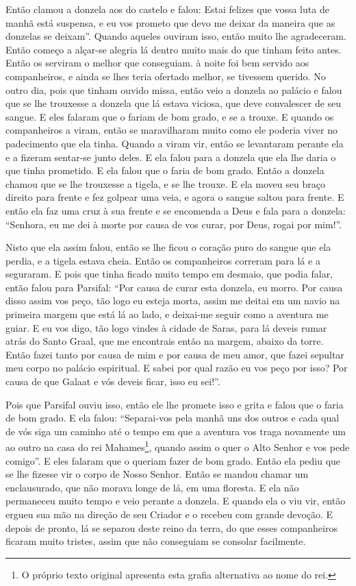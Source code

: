 Então clamou a donzela aos do castelo e falou: Estai felizes que vossa luta de
manhã está suspensa, e eu vos prometo que devo me deixar da maneira que as
donzelas se deixam”. Quando aqueles ouviram isso, então muito lhe agradeceram.
Então começo a alçar-se alegria lá dentro muito mais do que tinham feito antes.
Então os serviram o melhor que conseguiam. à noite foi bem servido aos
companheiros, e ainda se lhes teria ofertado melhor, se tivessem querido. No
outro dia, pois que tinham ouvido missa, então veio a donzela ao palácio e
falou que se lhe trouxesse a donzela que lá estava viciosa, que deve
convalescer de seu sangue. E eles falaram que o fariam de bom grado, e se a
trouxe. E quando os companheiros a viram, então se maravilharam muito como ele
poderia viver no padecimento que ela tinha. Quando a viram vir, então se
levantaram perante ela e a fizeram sentar-se junto deles. E ela falou para a
donzela que ela lhe daria o que tinha prometido. E ela falou que o faria de bom
grado. Então a donzela chamou que se lhe trouxesse a tigela, e se lhe trouxe. E
ela moveu seu braço direito para frente e fez golpear uma veia, e agora o
sangue saltou para frente. E então ela faz uma cruz à sua frente e se encomenda
a Deus e fala para a donzela: “Senhora, eu me dei à morte por causa de vos
curar, por Deus, rogai por mim!”.

Nisto que ela assim falou, então se lhe ficou o coração puro do sangue que ela
perdia, e a tigela estava cheia. Então os companheiros correram para lá e a
seguraram. E pois que tinha ficado muito tempo em desmaio, que podia falar,
então falou para Parsifal: “Por causa de curar esta donzela, eu morro. Por
causa disso assim vos peço, tão logo eu esteja morta, assim me deitai em um
navio na primeira margem que está lá ao lado, e deixai-me seguir como a
aventura me guiar. E eu vos digo, tão logo vindes à cidade de Saras, para lá
deveis rumar atrás do Santo Graal, que me encontrais então na margem, abaixo da
torre. Então fazei tanto por causa de mim e por causa de meu amor, que fazei
sepultar meu corpo no palácio espiritual. E sabei por qual razão eu vos peço
por isso? Por causa de que Galaat e vós deveis ficar, isso eu sei!”.

Pois que Parsifal ouviu isso, então ele lhe promete isso e grita e falou que o
faria de bom grado. E ela falou: “Separai-vos pela manhã uns dos outros e cada
qual de vós siga um caminho até o tempo em que a aventura vos traga novamente
um ao outro na casa do rei Mahames\footnote{ O próprio texto original apresenta
esta grafia alternativa ao nome do rei.},  quando assim o quer o
Alto Senhor e vos pede comigo”. E eles falaram que o queriam fazer de bom
grado. Então ela pediu que se lhe fizesse vir o corpo de Nosso Senhor. Então se
mandou chamar um enclausurado, que não morava longe de lá, em uma floresta. E
ela não permaneceu muito tempo e veio perante a donzela. E quando ela o viu
vir, então ergueu sua mão na direção de seu Criador e o recebeu com grande
devoção. E depois de pronto, lá se separou deste reino da terra, do que esses
companheiros ficaram muito tristes, assim que não conseguiam se consolar
facilmente.

